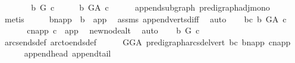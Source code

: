 \begin{isabellebody}
%
\isadelimproof
%
\endisadelimproof
%
\isatagproof
{}\isamarkupfalse%
\ \ \isanewline
\ \ \isamarkupfalse%
\ {\isachardoublequoteopen}\ b\ {\isasymrightarrow}\isactrlbsub G\isactrlesub \ c{\isachardoublequoteclose}\isanewline
\ \ \isamarkupfalse%
\ \isamarkupfalse%
\ {\isachardoublequoteopen}b\ {\isasymrightarrow}\isactrlbsub G{\isacharunderscore}{\kern0pt}A\isactrlesub \ c{\isachardoublequoteclose}\isanewline
\ \ \ \ \isamarkupfalse%
\ append{\isacharunderscore}{\kern0pt}subgraph\ pre{\isacharunderscore}{\kern0pt}digraph{\isachardot}{\kern0pt}adj{\isacharunderscore}{\kern0pt}mono\isanewline
\ \ \ \ \isamarkupfalse%
\ metis\isanewline
{}\isamarkupfalse%
\ \isanewline
\ \ \isamarkupfalse%
\ b{\isacharunderscore}{\kern0pt}napp\ {\isacharcolon}{\kern0pt}\ {\isachardoublequoteopen}b\ {\isasymnoteq}\ app{\isachardoublequoteclose}\ \isamarkupfalse%
\ assms{\isacharparenleft}{\kern0pt}{}{\isacharparenright}{\kern0pt}\ append{\isacharunderscore}{\kern0pt}verts{\isacharunderscore}{\kern0pt}diff\ \isamarkupfalse%
\ auto\isanewline
\ \ \isamarkupfalse%
\ bc{\isacharcolon}{\kern0pt}\ {\isachardoublequoteopen}b\ {\isasymrightarrow}\isactrlbsub G{\isacharunderscore}{\kern0pt}A\isactrlesub \ c{\isachardoublequoteclose}\ \isanewline
\ \ \isamarkupfalse%
\ \isamarkupfalse%
\ \ c{\isacharunderscore}{\kern0pt}napp{\isacharcolon}{\kern0pt}\ {\isachardoublequoteopen}c\ {\isasymnoteq}\ app{\isachardoublequoteclose}\ \isamarkupfalse%
\ new{\isacharunderscore}{\kern0pt}node{\isacharunderscore}{\kern0pt}alt\ \isamarkupfalse%
\ auto\isanewline
\ \ \isamarkupfalse%
\ {\isachardoublequoteopen}b\ {\isasymrightarrow}\isactrlbsub G\isactrlesub \ c{\isachardoublequoteclose}\ \ \isamarkupfalse%
\ arcs{\isacharunderscore}{\kern0pt}ends{\isacharunderscore}{\kern0pt}def\ arc{\isacharunderscore}{\kern0pt}to{\isacharunderscore}{\kern0pt}ends{\isacharunderscore}{\kern0pt}def\isanewline
\ \ \ \ \isamarkupfalse%
\ GG{\isacharunderscore}{\kern0pt}A\ pre{\isacharunderscore}{\kern0pt}digraph{\isachardot}{\kern0pt}arcs{\isacharunderscore}{\kern0pt}del{\isacharunderscore}{\kern0pt}vert\ bc\ b{\isacharunderscore}{\kern0pt}napp\ c{\isacharunderscore}{\kern0pt}napp\isanewline
\ \ \ \ \isamarkupfalse%
\ append{\isacharunderscore}{\kern0pt}head\ append{\isacharunderscore}{\kern0pt}tail\ \isamarkupfalse%

\end{isabellebody}
